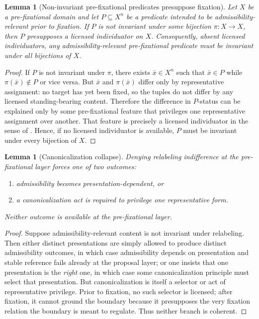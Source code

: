 \documentclass[11pt]{article}
\newtheorem{lemma}[theorem]{Lemma}
\theoremstyle{definition}
\begin{document}
\begin{lemma}[Non-invariant pre-fixational predicates presuppose fixation]
\label{lem:noninvariant-presupposes-fixation}
Let $X$ be a pre-fixational domain and let $P\subseteq X^n$ be a predicate intended to be admissibility-relevant prior to fixation.
If $P$ is not invariant under some bijection $\pi:X\to X$, then $P$ presupposes a licensed individuator on $X$.
Consequently, absent licensed individuators, any admissibility-relevant pre-fixational predicate must be invariant under all bijections of $X$.
\end{lemma}

\begin{proof}
If $P$ is not invariant under $\pi$, there exists $\bar x\in X^n$ such that $\bar x\in P$ while $\pi(\bar x)\notin P$ or vice versa.
But $\bar x$ and $\pi(\bar x)$ differ only by representative assignment: no target has yet been fixed, so the tuples do not differ by any licensed standing-bearing content.
Therefore the difference in $P$-status can be explained only by some pre-fixational feature that privileges one representative assignment over another.
That feature is precisely a licensed individuator in the sense of .
Hence, if no licensed individuator is available, $P$ must be invariant under every bijection of $X$.
\end{proof}

\begin{lemma}[Canonicalization collapse]
\label{lem:canonicalization-collapse}
Denying relabeling indifference at the pre-fixational layer forces one of two outcomes:
\begin{enumerate}[label=\textbf{(\roman*)}, leftmargin=2.6em]
\item admissibility becomes presentation-dependent, or
\item a canonicalization act is required to privilege one representative form.
\end{enumerate}
Neither outcome is available at the pre-fixational layer.
\end{lemma}

\begin{proof}
Suppose admissibility-relevant content is not invariant under relabeling.
Then either distinct presentations are simply allowed to produce distinct admissibility outcomes, in which case admissibility depends on presentation and stable reference fails already at the proposal layer; or one insists that one presentation is the \emph{right} one, in which case some canonicalization principle must select that presentation.
But canonicalization is itself a selector or act of representative privilege.
Prior to fixation, no such selector is licensed; after fixation, it cannot ground the boundary because it presupposes the very fixation relation the boundary is meant to regulate.
Thus neither branch is coherent.
\end{proof}
\end{document}

